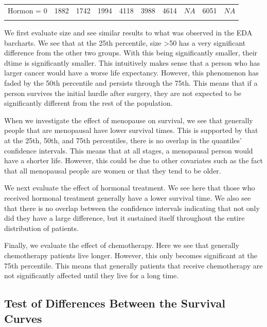\documentclass[
]{article}
\begin{document}
\begin{table}[!h]
\begin{tabular}[t]{lrrrrrllll}
Hormon = 0 & 1882 & 1742 & 1994 & 4118 & 3988 & 4614 & $\textit{NA}$ & 6051 & $\textit{NA}$\\
\cellcolor{gray!6}{Hormon = 1} & \cellcolor{gray!6}{1361} & \cellcolor{gray!6}{1140} & \cellcolor{gray!6}{1618} & \cellcolor{gray!6}{2866} & \cellcolor{gray!6}{2450} & \cellcolor{gray!6}{3472} & \cellcolor{gray!6}{$\textit{NA}$} & \cellcolor{gray!6}{$\textit{NA}$} & \cellcolor{gray!6}{$\textit{NA}$}\\
\bottomrule
\end{tabular}
\end{table}

We first evaluate size and see similar results to what was observed in the EDA barcharts. We see that at the 25th percentile, size \textgreater50 has a very significant difference from the other two groups. With this being significantly smaller, their dtime is significantly smaller. This intuitively makes sense that a person who has larger cancer would have a worse life expectancy. However, this phenomenon has faded by the 50th percentile and persists through the 75th. This means that if a person survives the initial hurdle after surgery, they are not expected to be significantly different from the rest of the population.

When we investigate the effect of menopause on survival, we see that generally people that are menopausal have lower survival times. This is supported by that at the 25th, 50th, and 75th percentiles, there is no overlap in the quantiles' confidence intervals. This means that at all stages, a menopausal person would have a shorter life. However, this could be due to other covariates such as the fact that all menopausal people are women or that they tend to be older.

We next evaluate the effect of hormonal treatment. We see here that those who received hormonal treatment generally have a lower survival time. We also see that there is no overlap between the confidence intervals indicating that not only did they have a large difference, but it sustained itself throughout the entire distribution of patients.

Finally, we evaluate the effect of chemotherapy. Here we see that generally chemotherapy patients live longer. However, this only becomes significant at the 75th percentile. This means that generally patients that receive chemotherapy are not significantly affected until they live for a long time.

\subsection{Test of Differences Between the Survival Curves}
\end{document}

